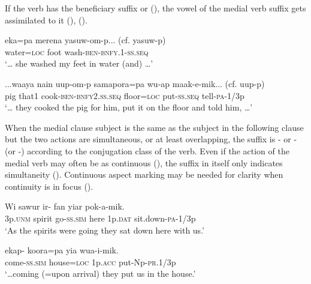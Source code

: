 If the verb has the beneficiary suffix  or  (), the vowel of the medial verb suffix gets assimilated to it (), ().

\ea%
\label{ex:x1930}
\gll {\dots}eka=pa merena yasuw-om-p... (cf. yasuw-p) \\
water=\textsc{loc} foot wash-\textsc{ben}-\textsc{bnfy}.1-\textsc{ss}.\textsc{seq}\\
\glt`{\dots} she washed my feet in water (and) {\dots}'
\z

\ea%
\label{ex:x1929}
\gll ...waaya nain uup-om-p samapora=pa wu-ap maak-e-mik... (cf. uup-p)\\
pig that1 cook-\textsc{ben}-\textsc{bnfy}2.\textsc{ss}.\textsc{seq} floor=\textsc{loc} put-\textsc{ss}.\textsc{seq} tell-\textsc{pa}-1/3p\\
\glt`{\dots} they cooked the pig for him, put it on the floor and told him, {\dots}'
\z

When the medial clause subject is the same as the subject in the following clause but the two actions are simultaneous, or at least overlapping, the suffix is \nobreakdash- or \nobreakdash- (or \nobreakdash-) according to the conjugation class of the verb. Even if the action of the medial verb may often be  as continuous (), the suffix in itself only indicates simultaneity (). Continuous aspect marking may be needed for clarity when continuity is in focus ().

\ea%
\label{ex:x239}
\gll Wi sawur ir- fan yiar pok-a-mik. \\
3p.\textsc{unm} spirit go-\textsc{ss}.\textsc{sim} here 1p.\textsc{dat} sit.down-\textsc{pa}-1/3p \\
\glt`As the spirits were going they sat down here with us.' 
\z

\ea%
\label{ex:x240}
\gll {\dots}ekap- koora=pa yia wua-i-mik. \\
come-\textsc{ss}.\textsc{sim} house=\textsc{loc} 1p.\textsc{acc} put-Np-\textsc{pr}.1/3p \\
\glt`{\dots}coming (=upon arrival) they put us in the house.' 
\z

